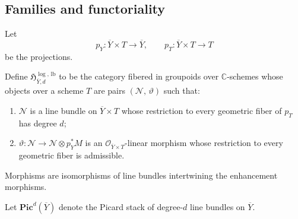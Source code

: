 \documentclass[a4paper,12pt]{amsart}
\numberwithin{equation}{section}
\theoremstyle{definition}
\newcommand{\OO}{\mathcal{O}}
\newcommand{\CC}{\mathbb C}
\begin{document}
\subsection{Families and functoriality}

Let
\[
p_Y:\overline{Y}\times T\longrightarrow \overline{Y},
\qquad
p_T:\overline{Y}\times T\longrightarrow T
\]
be the projections.

Define \(\mathfrak H^{\log,\,\mathrm{lb}}_{\overline{Y},d}\) to be the category fibered in groupoids over \(\CC\)-schemes whose objects over a scheme \(T\) are pairs \((\mathcal N,\,\vartheta)\) such that:
\begin{enumerate}
\item[(i)] \(\mathcal N\) is a line bundle on \(\overline{Y}\times T\) whose restriction to every geometric fiber of \(p_T\) has degree \(d\);
\item[(ii)] \(\vartheta:\mathcal N\longrightarrow \mathcal N\otimes p_Y^*M\) is an \(\OO_{\overline{Y}\times T}\)-linear morphism whose restriction to every geometric fiber is admissible.
\end{enumerate}
Morphisms are isomorphisms of line bundles intertwining the enhancement morphisms.

Let \(\mathbf{Pic}^d(\overline{Y})\) denote the Picard stack of degree-\(d\) line bundles on \(\overline{Y}\).
\end{document}
